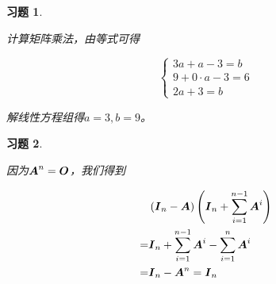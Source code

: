 \documentclass{ctexart}
\newtheorem{problem}{习题}[section]
\begin{document}
\begin{problem}\

计算矩阵乘法，由等式可得

\begin{equation*}
    \begin{cases}
        3a+a-3=b       \\
        9+0\cdot a-3=6 \\
        2a+3=b
    \end{cases}
\end{equation*}

解线性方程组得\(a=3,b=9\)。

\end{problem}

\begin{problem}\

因为\(\boldsymbol{A}^n=\boldsymbol{O}\)，我们得到

\begin{align*}
      & \left( \boldsymbol{I}_n-\boldsymbol{A} \right)\left( \boldsymbol{I}_n+\sum_{i=1}^{n-1}\boldsymbol{A}^i \right) \\
    = & \boldsymbol{I}_n+\sum_{i=1}^{n-1}\boldsymbol{A}^i-\sum_{i=1}^n\boldsymbol{A}^i          \\
    = & \boldsymbol{I}_n-\boldsymbol{A}^n=\boldsymbol{I}_n
\end{align*}

\end{problem}
\end{document}
